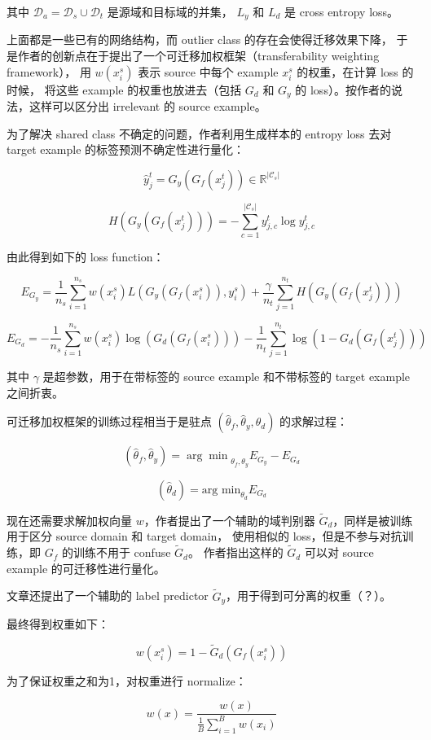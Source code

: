 \documentclass[UTF8]{ctexart}
\begin{document}
其中 $\mathcal{D}_a = \mathcal{D}_s \cup \mathcal{D}_t$ 是源域和目标域的并集，
$L_y$ 和 $L_d$ 是 cross entropy loss。

上面都是一些已有的网络结构，而 outlier class 的存在会使得迁移效果下降，
于是作者的创新点在于提出了一个可迁移加权框架（transferability weighting framework），
用 $w(x_i^s)$ 表示 source 中每个 example $x_i^s$ 的权重，在计算 loss 的时候，
将这些 example 的权重也放进去（包括 $G_d$ 和 $G_y$ 的 loss）。按作者的说法，这样可以区分出 irrelevant 的 source example。

为了解决 shared class 不确定的问题，作者利用生成样本的 entropy loss 去对 target example 的标签预测不确定性进行量化：

$$
\hat{y}_j^t = G_y(G_f(x_j^t)) \in \mathbb{R}^{|\mathcal{C}_s|}
$$

$$
H(G_y(G_f(x_j^t))) = -\sum_{c=1}^{|\mathcal{C}_s|} y_{j, c}^t \log y_{j, c}^t
$$

由此得到如下的 loss function：

$$
E_{G_y} = \frac{1}{n_s}\sum_{i=1}^{n_s} w(x_i^s)L(G_y(G_f(x_i^s)), y_i^s) + \frac{\gamma}{n_t}\sum_{j=1}^{n_t} H(G_y(G_f(x_j^t)))
$$

$$
E_{G_d} = - \frac{1}{n_s}\sum_{i=1}^{n_s} w(x_i^s)\log(G_d(G_f(x_i^s))) - \frac{1}{n_t}\sum_{j=1}^{n_t}\log(1 - G_d(G_f(x_j^t)))
$$

其中 $\gamma$ 是超参数，用于在带标签的 source example 和不带标签的 target example 之间折衷。

可迁移加权框架的训练过程相当于是驻点 $(\hat{\theta}_f, \hat{\theta}_y, \hat{\theta}_d)$ 的求解过程：

$$
(\hat{\theta}_f, \hat{\theta}_y) = {\arg \min}_{\theta_f, \theta_y} E_{G_y} - E_{G_d}
$$

$$
(\hat{\theta}_d) = \text{arg min}_{\theta_d} E_{G_d}
$$

现在还需要求解加权向量 $w$，作者提出了一个辅助的域判别器 $\tilde{G}_d$，同样是被训练用于区分 source domain 和 target domain，
使用相似的 loss，但是不参与对抗训练，即 $G_f$ 的训练不用于 confuse $\tilde{G}_d$。
作者指出这样的 $\tilde{G}_d$ 可以对 source example 的可迁移性进行量化。

文章还提出了一个辅助的 label predictor $\tilde{G}_y$，用于得到可分离的权重（？）。

最终得到权重如下：

$$
w(x_i^s) = 1 - \tilde{G}_d(G_f(x_i^s))
$$

为了保证权重之和为1，对权重进行 normalize：

$$
w(x) = \frac{w(x)}{\frac{1}{B}\sum_{i=1}^B w(x_i)}
$$
\end{document}
